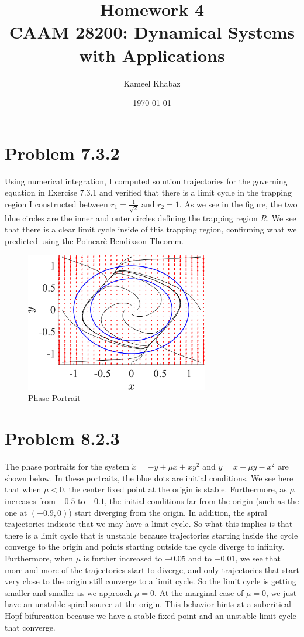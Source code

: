 \documentclass[11pt]{article}
\title{Homework 4 \large \\ CAAM 28200: Dynamical Systems with Applications}
\author{Kameel Khabaz}
\date{\today}
\begin{document}
\maketitle

\section*{Problem 7.3.2}
Using numerical integration, I computed solution trajectories for the governing equation in Exercise 7.3.1 and verified that there is a limit cycle in the trapping region I constructed between $r_1 = \frac{1}{\sqrt{2}}$ and $r_2=1$. As we see in the figure, the two blue circles are the inner and outer circles defining the trapping region $R$. We see that there is a clear limit cycle inside of this trapping region, confirming what we predicted using the Poincarè Bendixson Theorem.
\begin{figure}[h]
\centering
\includegraphics[width=8cm]{7.3.2_plot.png}
\caption{Phase Portrait}
\end{figure}

\section*{Problem 8.2.3}
The phase portraits for the system $\dot x = -y + \mu x + x y^2$ and $\dot y = x + \mu y - x^2$ are shown below. In these portraits, the blue dots are initial conditions. We see here that when $\mu < 0$, the center fixed point at the origin is stable. Furthermore, as $\mu$ increases from $-0.5$ to $-0.1$, the initial conditions far from the origin (such as the one at $(-0.9,0)$) start diverging from the origin. In addition, the spiral trajectories indicate that we may have a limit cycle. So what this implies is that there is a limit cycle that is unstable because trajectories starting inside the cycle converge to the origin and points starting outside the cycle diverge to infinity. Furthermore, when $\mu$ is further increased to $-0.05$ and to $-0.01$, we see that more and more of the trajectories start to diverge, and only trajectories that start very close to the origin still converge to a limit cycle. So the limit cycle is getting smaller and smaller as we approach $\mu = 0$. At the marginal case of $\mu = 0$, we just have an unstable spiral source at the origin. This behavior hints at a subcritical Hopf bifurcation because we have a stable fixed point and an unstable limit cycle that converge. 
\end{document}

